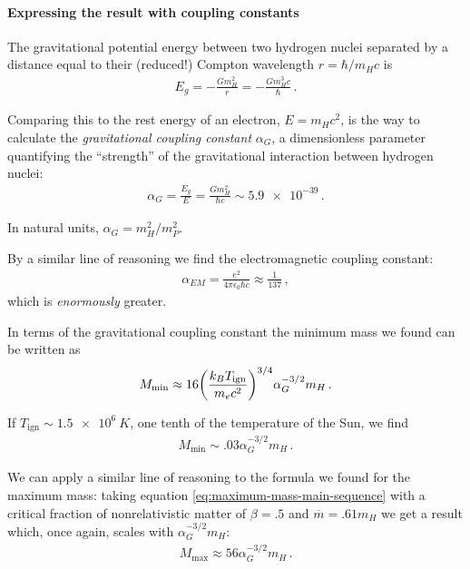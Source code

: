 \documentclass[main.tex]{subfiles}
\begin{document}
\paragraph{Expressing the result with coupling constants}

The gravitational potential energy between two hydrogen nuclei separated by a distance equal to their (reduced!) Compton wavelength \(r = \hbar / m_H c\) is 
%
\begin{align}
E_g = - \frac{G m_H^2}{r} = - \frac{G m_H^{3}c }{\hbar}
\,.
\end{align}

Comparing this to the rest energy of an electron, \(E = m_H c^2\), is the way to calculate the \emph{gravitational coupling constant} \(\alpha _G\), a dimensionless parameter quantifying the ``strength'' of the gravitational interaction between hydrogen nuclei:
%
\begin{align}
  \alpha_{G} = \frac{E_g}{E} =  \frac{G m_H^2}{\hbar c} \sim \num{5.9e-39}
\,.
\end{align}

In natural units, \(\alpha _G = m_H^2 / m_P^2\).

By a similar line of reasoning we find the electromagnetic coupling constant:
%
\begin{align}
  \alpha_{EM} = \frac{e^2}{4 \pi \epsilon_{0} \hbar c} \approx \frac{1}{137}
\,,
\end{align}
%
which is \emph{enormously} greater. 

In terms of the gravitational coupling constant the minimum mass we found can be written as 
%
\begin{align}
  M _{\text{min}} \approx
  16 \qty(\frac{k_B T _{\text{ign}}}{m_e c^2})^{3/4}
  \alpha_{G}^{-3/2} m_H
\,.
\end{align}

If \(T _{\text{ign}} \sim \SI{1.5e6}{K}\), one tenth of the temperature of the Sun, we find 
%
\begin{align}
  M _{\text{min}} \sim \num{.03} \alpha_{G}^{-3/2} m_H
\,.
\end{align}

We can apply a similar line of reasoning to the formula we found for the maximum mass: taking equation \eqref{eq:maximum-mass-main-sequence}  with a critical fraction of nonrelativistic matter of \(\beta = \num{.5}\) and \(\overline{m} = \num{.61} m_H\) we get a result which, once again, scales with \(\alpha _G^{-3/2} m_H\):
%
\begin{align}
  M _{\text{max}} \approx 56 \alpha_{G}^{-3/2} m_H
\,.
\end{align}
\end{document}
